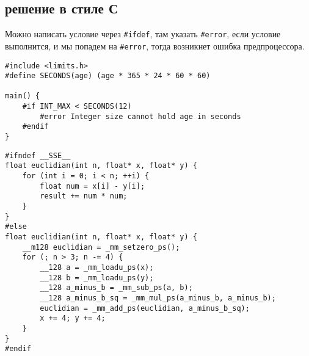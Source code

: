 \subsection{решение в стиле С}
Можно написать условие через \texttt{\#ifdef}, там указать \texttt{\#error}, если условие выполнится, и мы попадем на \texttt{\#error}, тогда возникнет ошибка предпроцессора.

\begin{verbatim}
#include <limits.h>
#define SECONDS(age) (age * 365 * 24 * 60 * 60)

main() {
    #if INT_MAX < SECONDS(12)
		#error Integer size cannot hold age in seconds
    #endif
}
\end{verbatim}
\begin{verbatim}
#ifndef __SSE__
float euclidian(int n, float* x, float* y) {
	for (int i = 0; i < n; ++i) {
		float num = x[i] - y[i];
		result += num * num;
	}
}
#else
float euclidian(int n, float* x, float* y) {
	__m128 euclidian = _mm_setzero_ps();
	for (; n > 3; n -= 4) {
		__128 a = _mm_loadu_ps(x);
		__128 b = _mm_loadu_ps(y);
		__128 a_minus_b = _mm_sub_ps(a, b);
		__128 a_minus_b_sq = _mm_mul_ps(a_minus_b, a_minus_b);
		euclidian = _mm_add_ps(euclidian, a_minus_b_sq);
		x += 4; y += 4;
	}
}
#endif
\end{verbatim}
